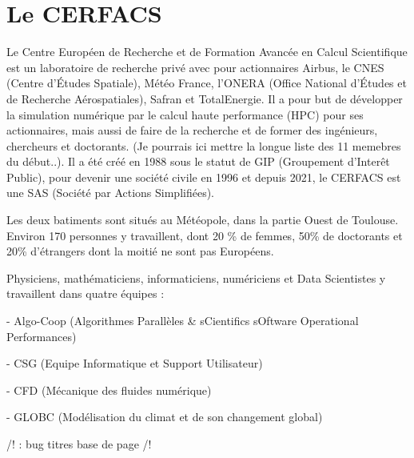 \chapter{Le CERFACS}

Le Centre Européen de Recherche et de Formation Avancée en Calcul Scientifique est un laboratoire de recherche privé avec pour actionnaires Airbus, le CNES (Centre d'Études Spatiale), Météo France, l'ONERA (Office National d'Études et de Recherche Aérospatiales), Safran et TotalEnergie. Il a pour but de développer la simulation numérique par le calcul haute performance (HPC) pour ses actionnaires, mais aussi de faire de la recherche et de former des ingénieurs, chercheurs et doctorants. (Je pourrais ici mettre la longue liste des 11 memebres du début..). Il a été créé en 1988 sous le statut de GIP (Groupement d'Interêt Public), pour devenir une société civile en 1996 et depuis 2021, le CERFACS est une SAS (Société par Actions Simplifiées).

Les deux batiments sont situés au Météopole, dans la partie Ouest de Toulouse. Environ 170 personnes y travaillent, dont 20 \% de femmes, 50\% de doctorants et 20\% d'étrangers dont la moitié ne sont pas Européens.

Physiciens, mathématiciens, informaticiens, numériciens et Data Scientistes y travaillent dans quatre équipes :

- Algo-Coop (Algorithmes Parallèles \& sCientifics sOftware Operational Performances)

- CSG (Equipe Informatique et Support Utilisateur)

- CFD (Mécanique des fluides numérique) %

- GLOBC (Modélisation du climat et de son changement global)


/! : bug titres base de page /! \vspace*{0.5\baselineskip}\vspace{0.5cm}


